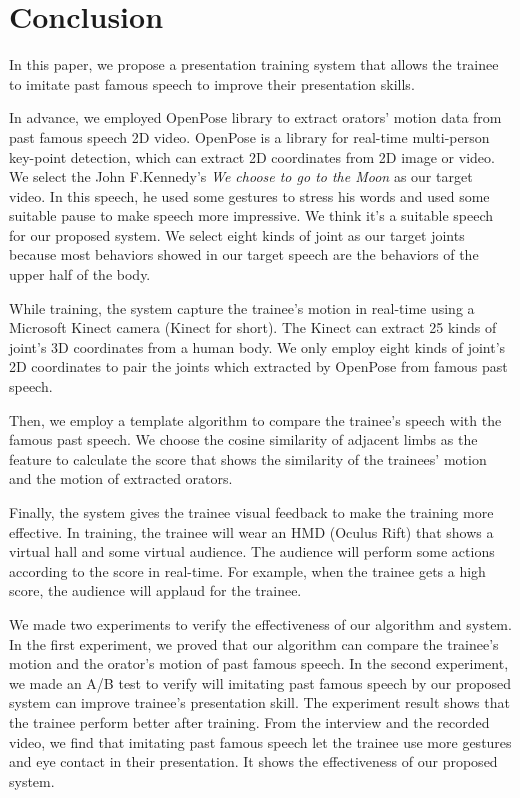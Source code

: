 \chapter{Conclusion}
\par In this paper, we propose a presentation training system that allows the trainee to imitate past famous speech to improve their presentation skills. 
\par In advance, we employed OpenPose library\cite{cao2017realtime} to extract orators' motion data from past famous speech 2D video. OpenPose is a library for real-time multi-person key-point detection, which can extract 2D coordinates from 2D image or video. We select the John F.Kennedy's \emph{We choose to go to the Moon} as our target video. In this speech, he used some gestures to stress his words and used some suitable pause to make speech more impressive. We think it's a suitable speech for our proposed system.
We select eight kinds of joint as our target joints because most behaviors showed in our target speech are the behaviors of the upper half of the body. 
\par While training, the system capture the trainee's motion in real-time using a Microsoft Kinect camera (Kinect for short). The Kinect can extract 25 kinds of joint's 3D coordinates from a human body. We only employ eight kinds of joint's 2D coordinates to pair the joints which extracted by OpenPose from famous past speech. 
\par Then, we employ a template algorithm to compare the trainee's speech with the famous past speech. We choose the cosine similarity of adjacent limbs as the feature to calculate the score that shows the similarity of the trainees' motion and the motion of extracted orators.
\par Finally, the system gives the trainee visual feedback to make the training more effective. In training, the trainee will wear an HMD (Oculus Rift) that shows a virtual hall and some virtual audience. The audience will perform some actions according to the score in real-time. For example, when the trainee gets a high score, the audience will applaud for the trainee.

\par We made two experiments to verify the effectiveness of our algorithm and system. In the first experiment, we proved that our algorithm can compare the trainee's motion and the orator's motion of past famous speech. In the second experiment, we made an A/B test to verify will imitating past famous speech by our proposed system can improve trainee's presentation skill. The experiment result shows that the trainee perform better after training. From the interview and the recorded video, we find that imitating past famous speech let the trainee use more gestures and eye contact in their presentation. It shows the effectiveness of our proposed system.

